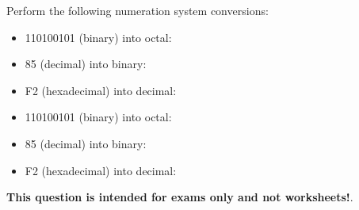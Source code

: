 

Perform the following numeration system conversions:

\begin{itemize}
\item{} 110100101 (binary) into octal: \underbar{\hskip 50pt}
\vskip 10pt
\item{} 85 (decimal) into binary: \underbar{\hskip 50pt}
\vskip 10pt
\item{} F2 (hexadecimal) into decimal: \underbar{\hskip 50pt}
\end{itemize}







\begin{itemize}
\item{} 110100101 (binary) into octal: 
\vskip 10pt
\item{} 85 (decimal) into binary: 
\vskip 10pt
\item{} F2 (hexadecimal) into decimal: 
\end{itemize}







{\bf This question is intended for exams only and not worksheets!}.




